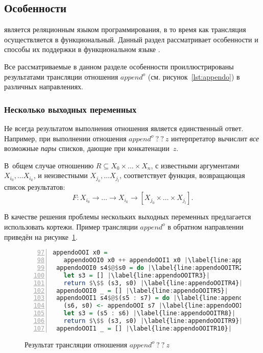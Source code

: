 \subsection{Особенности \miniKanren{}}
\label{lab:features}

\miniKanren{} является реляционным языком программирования, в то время как трансляция осуществляется в функциональный.
Данный раздел рассматривает особенности \miniKanren{} и способы их поддержки в функциональном языке \haskell{}.

Все рассматриваемые в данном разделе особенности проиллюстрированы результатами трансляции отношения $append^o$ (см. рисунок~\ref{lst:appendo}) в различных направлениях.


\subsubsection{Несколько выходных переменных}

Не всегда результатом выполнения отношения является единственный ответ.
Например, при выполнении отношения $append^o \ ? \ ? \ z$ интерпретатор \miniKanren{} вычислит \emph{все} возможные \emph{пары} списков, дающие при конкатенации~$z$.

В~общем случае отношению $R \subseteq X_0 \times \dots \times X_n$, с известными аргументами $X_{i_0}, \dots X_{i_k}$, и неизвестными $X_{j_0}, \dots X_{j_l}$, соответствует функция, возвращающая список результатов:
\[F : X_{i_0} \to \dots \to X_{i_k} \to [X_{j_0} \times \dots \times X_{j_l}].\]

В качестве решения проблемы нескольких выходных переменных предлагается использовать кортежи.
Пример трансляции $append^o$ в обратном направлении приведён на рисунке~\ref{lst:appendoOOITR}.

\begin{figure}[h!]
  \begin{center}
  \begin{minipage}{0.73\textwidth}
  \begin{lstlisting}[language=Haskell, frame=single, numbers=left,numberstyle=\small, firstnumber=97, escapechar=|]
 appendoOOI x0 =
   appendoOOI0 x0 ++ appendoOOI1 x0 |\label{line:appendoOOITR1}|
 appendoOOI0 s4$@$s0 = do |\label{line:appendoOOITR2}|
   let s3 = [] |\label{line:appendoOOITR3}|
   return $\$$ (s3, s0) |\label{line:appendoOOITR4}|
 appendoOOI0 _ = [] |\label{line:appendoOOITR5}|
 appendoOOI1 s4$@$(s5 : s7) = do |\label{line:appendoOOITR6}|
   (s6, s0) <- appendoOOI s7 |\label{line:appendoOOITR7}|
   let s3 = (s5 : s6) |\label{line:appendoOOITR8}|
   return $\$$ (s3, s0) |\label{line:appendoOOITR9}|
 appendoOOI1 _ = [] |\label{line:appendoOOITR10}|
    \end{lstlisting}
  \end{minipage}
  \end{center}
  \caption{Результат трансляции отношения $append^o \ ? \ ? \ z$}
  \label{lst:appendoOOITR}
\end{figure}

